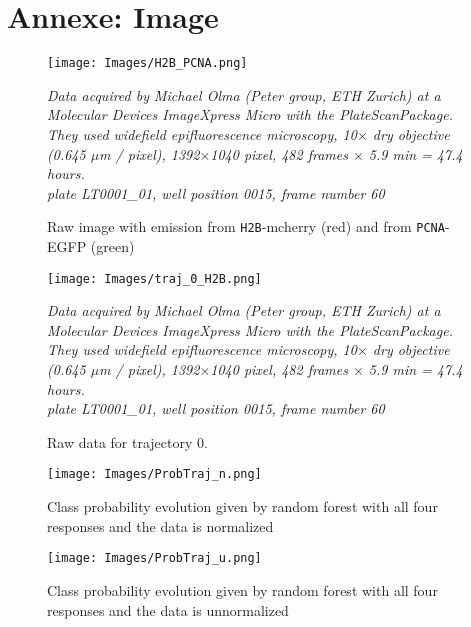 \documentclass{article}
\begin{document}
\section{Annexe: Image}
\begin{figure}[!ht]
\centering
\texttt{[image: Images/H2B\_PCNA.png]}
\caption{Raw image with emission from \texttt{H2B}-mcherry (red) and from \texttt{PCNA}-EGFP (green)}
\label{fig: annexe: H2B and PCNA}
\textit{Data acquired by Michael Olma (Peter group, ETH Zurich) at a Molecular Devices ImageXpress Micro with the PlateScanPackage. They used widefield epifluorescence microscopy, 10$\times$ dry objective (0.645 $\mu$m / pixel), 1392$\times$1040 pixel, 482 frames $\times$ 5.9 min = 47.4 hours. }\\
\textit{plate \textit{LT0001\_01}, well position 0015, frame number 60}
\end{figure}

\begin{figure}[!ht]
\centering
\texttt{[image: Images/traj\_0\_H2B.png]}
\caption{Raw data for trajectory 0.}
\label{fig: annexe: RawData_traj0}
\textit{Data acquired by Michael Olma (Peter group, ETH Zurich) at a Molecular Devices ImageXpress Micro with the PlateScanPackage. They used widefield epifluorescence microscopy, 10$\times$ dry objective (0.645 $\mu$m / pixel), 1392$\times$1040 pixel, 482 frames $\times$ 5.9 min = 47.4 hours. }\\
\textit{plate \textit{LT0001\_01}, well position 0015, frame number 60}
\end{figure}

\begin{figure}[!ht]
\centering
\texttt{[image: Images/ProbTraj\_n.png]}
\caption{Class probability evolution given by random forest with all four responses and the data is normalized}
\label{fig: annexe: ProbabilityEvolution_n}
\end{figure}

\begin{figure}[!ht]
\centering
\texttt{[image: Images/ProbTraj\_u.png]}
\caption{Class probability evolution given by random forest with all four responses and the data is unnormalized}
\label{fig: annexe: ProbabilityEvolution_u}
\end{figure}

\clearpage
\end{document}
